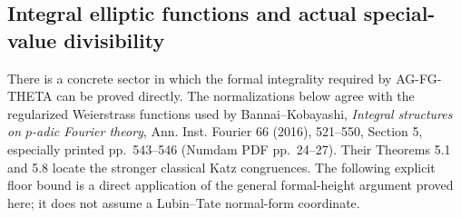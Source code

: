 \subsection{Integral elliptic functions and actual special-value divisibility}
\label{ag:elliptic-integrality}

There is a concrete sector in which the formal integrality required
by AG-FG-THETA can be proved directly. The normalizations below agree
with the regularized Weierstrass functions used by Bannai--Kobayashi,
\emph{Integral structures on $p$-adic Fourier theory}, Ann. Inst.
Fourier 66 (2016), 521--550, Section 5, especially printed pp.~543--546
(Numdam PDF pp.~24--27). Their Theorems 5.1 and 5.8 locate the stronger
classical Katz congruences. The following explicit floor bound is a
direct application of the general formal-height argument proved here;
it does not assume a Lubin--Tate normal-form coordinate.

